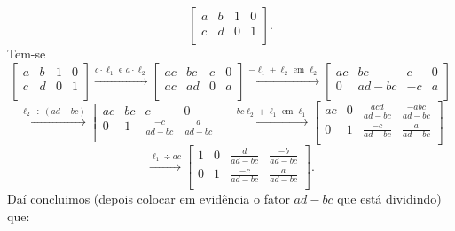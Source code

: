 \documentclass[../livro.tex]{subfiles}  %
\begin{document}
\begin{equation}
\left[
\begin{array}{cc|cc}
a & b & 1 & 0 \\
c & d & 0 & 1 \\
\end{array}
\right].
\end{equation} Tem-se
\begin{equation}
\left[
\begin{array}{cc|cc}
a & b & 1 & 0 \\
c & d & 0 & 1 \\
\end{array}
\right] \xrightarrow{c\cdot \ell_1 \text{ e } a\cdot \ell_2}
\left[
\begin{array}{cc|cc}
ac & bc & c & 0 \\
ac & ad & 0 & a \\
\end{array}
\right] \xrightarrow{-\ell_1 + \ell_2 \text{ em } \ell_2}
\left[
\begin{array}{cc|cc}
ac & bc      & c  & 0 \\
0 & ad - bc & -c & a \\
\end{array}
\right]
\end{equation}
\begin{equation}
\xrightarrow{\ell_2 \div (ad-bc)}
\left[
\begin{array}{cc|cc}
ac & bc      & c  & 0 \\
0 & 1 & \frac{-c}{ad - bc} & \frac{a}{ad - bc} \\
\end{array}
\right]  \xrightarrow{-bc\ell_2 + \ell_1 \text{ em } \ell_1}
\left[
\begin{array}{cc|cc}
ac & 0 & \frac{acd}{ad - bc} & \frac{-abc}{ad - bc} \\
0 & 1 & \frac{-c}{ad - bc}  & \frac{a}{ad - bc} \\
\end{array}
\right]
\end{equation}
\begin{equation}
\xrightarrow{\ell_1 \div ac}
\left[
\begin{array}{cc|cc}
1 & 0 & \frac{ d}{ad - bc}  & \frac{-b}{ad - bc} \\
0 & 1 & \frac{-c}{ad - bc}  & \frac{ a}{ad - bc} \\
\end{array}
\right].
\end{equation} Daí concluimos (depois colocar em evidência o fator $ad - bc$ que está dividindo) que:
\end{document}
